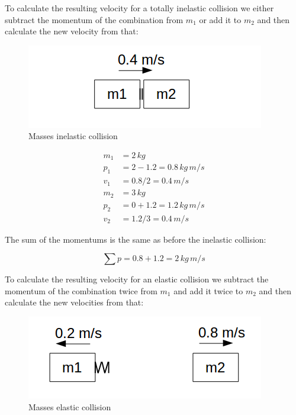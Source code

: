 \documentclass[]{../common/elementary-physics}
\begin{document}
To calculate the resulting velocity for a totally inelastic collision we either subtract the momentum of the combination from $m_1$ or add it to $m_2$ and then calculate the new velocity from that:

\begin{figure}[ht] \centering
	\includegraphics[scale=.5]{mms5} \caption{Masses inelastic collision}
\end{figure}

\begin{subequations}
\begin{align}
m_1 &= 2 \, kg \\
p_1 &= 2 - 1.2 = 0.8 \, kg \, m/s \\
v_1 &= 0.8 / 2 = 0.4 \, m/s \\
m_2 &= 3 \, kg \\
p_2 &= 0 + 1.2 = 1.2 \, kg \, m/s \\
v_2 &= 1.2 / 3 = 0.4 \, m/s
\end{align}
\end{subequations}

The sum of the momentums is the same as before the inelastic collision:

\begin{equation}
\sum p = 0.8 + 1.2 = 2 \, kg \, m/s
\end{equation}

To calculate the resulting velocity for an elastic collision we subtract the momentum of the combination twice from $m_1$ and add it twice to $m_2$ and then calculate the new velocities from that:

\begin{figure}[ht] \centering
	\includegraphics[scale=.5]{mms6} \caption{Masses elastic collision}
\end{figure}
\end{document}
